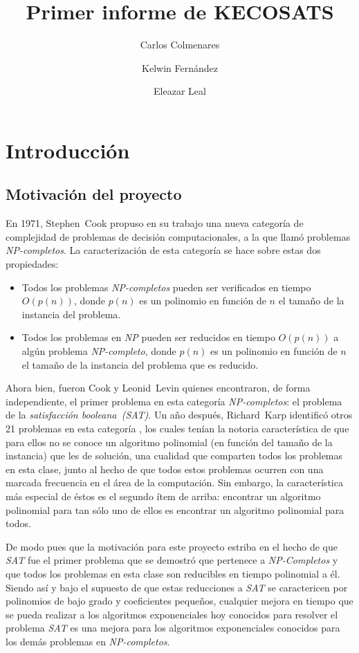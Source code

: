 \documentclass[12pt,lettersize,oneside]{article}
\title{Primer informe de KECOSATS}
\author{Carlos Colmenares \and Kelwin Fernández \and Eleazar Leal}
\begin{document}
\maketitle
\setlength{\parskip}{2.5mm}
\setlength{\itemsep}{0ex }
\section{Introducción}

\subsection{Motivación del proyecto}
En 1971, Stephen~Cook propuso en su trabajo\cite{Cook} una nueva categoría de complejidad
de problemas de decisión computacionales, a la que llamó problemas
\emph{NP-completos}. La caracterización de esta categoría se hace sobre estas
dos propiedades:
\begin{itemize}
  \item Todos los problemas \emph{NP-completos} pueden ser verificados en tiempo
    $O(p(n))$, donde $p(n)$ es un polinomio en función de $n$ el tamaño de la
    instancia del problema. 
  \item Todos los problemas en \emph{NP} pueden ser reducidos en tiempo
    $O(p(n))$ a algún problema \emph{NP-completo}, donde $p(n)$ es un polinomio
    en función de $n$ el tamaño de la instancia del problema que es reducido.
\end{itemize}

Ahora bien, fueron Cook y Leonid~Levin quienes encontraron, de forma
independiente, el primer problema en esta categoría \emph{NP-completos}: el
problema de la \emph{satisfacción booleana~(SAT)}. Un año después, Richard~Karp
identificó otros 21 problemas en esta categoría \cite{Karp}, los cuales tenían
la notoria característica de que para ellos no se conoce un algoritmo polinomial
(en función del tamaño de la instancia) que les de solución, una cualidad que
comparten todos los problemas en esta clase, junto al hecho de que todos estos
problemas ocurren con una marcada frecuencia en el área de la computación. Sin
embargo, la característica más especial de éstos es el segundo ítem de arriba:
encontrar un algoritmo polinomial para tan sólo uno de ellos es encontrar un
algoritmo polinomial para todos.

De modo pues que la motivación para este proyecto estriba en el hecho de que
\emph{SAT} fue el primer problema que se demostró que pertenece a
\emph{NP-Completos} y que todos los problemas en esta clase son reducibles en
tiempo polinomial a él. Siendo así y bajo el supuesto de que estas reducciones a
\emph{SAT} se caractericen por polinomios de bajo grado y coeficientes pequeños,
cualquier mejora en tiempo que se pueda realizar a los algoritmos exponenciales
hoy conocidos para resolver el problema \emph{SAT} es una mejora para los
algoritmos exponenciales conocidos para los demás problemas en
\emph{NP-completos}.
\end{document}
